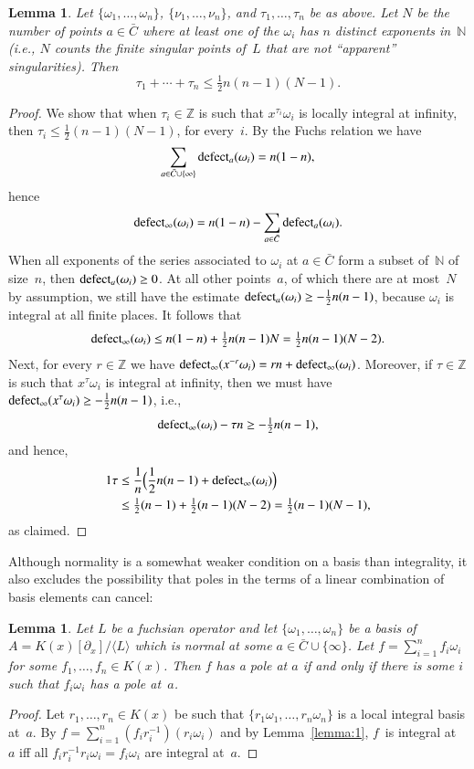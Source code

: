 \documentclass[final,1p,times,authoryear]{elsarticle}
\newtheorem{lemma}[theorem]{Lemma}
\def\<#1>{\langle#1\rangle}
\let\set\mathbb
\begin{document}
\begin{lemma}\label{lemma:bound-exps}
  Let $\{\omega_1,\dots,\omega_n\}$, $\{\nu_1,\dots,\nu_n\}$, and $\tau_1,\dots,\tau_n$ be as above.
  Let $N$ be the number of points $a\in\bar C$ where at least one of the $\omega_i$ has
  $n$ distinct exponents in~$\set N$ (i.e., $N$ counts the
  finite singular points of~$L$ that are not ``apparent'' singularities).
  Then
  \[
    \tau_1+\cdots+\tau_n \leq \tfrac12 n(n-1)(N-1).
  \]
\end{lemma}
\begin{proof}
  We show that when $\tau_i\in\set Z$ is such that $x^{\tau_i}\omega_i$ is locally integral at infinity,
  then $\tau_i\leq \frac12 (n-1)(N-1)$, for every~$i$.
  By the Fuchs relation we have
  \[
    \sum_{a\in\bar C\cup\{\infty\}}\operatorname{defect}_a(\omega_i) = n(1-n),
  \]
  hence
  \[
    \operatorname{defect}_\infty(\omega_i) = n(1-n) - \sum_{a\in\bar C}\operatorname{defect}_a(\omega_i).
  \]
  When all exponents of the series associated to $\omega_i$ at $a\in\bar C$ form a subset of~$\set N$ of size~$n$, then
  $\operatorname{defect}_a(\omega_i)\geq0$. At all other points~$a$, of which there are at most~$N$ by assumption,
  we still have the estimate $\operatorname{defect}_a(\omega_i)\geq-\frac12n(n-1)$, because $\omega_i$ is integral at all finite places.
  It follows that
  \[
    \operatorname{defect}_\infty(\omega_i)\leq n(1-n) + \tfrac12 n(n-1) N = \tfrac12 n(n-1)(N-2).
  \]
  Next, for every $r\in\set Z$ we have $\operatorname{defect}_\infty(x^{-r}\omega_i) = rn+\operatorname{defect}_\infty(\omega_i)$.
  Moreover, if $\tau\in\set Z$ is such that $x^{\tau}\omega_i$ is integral at infinity, then we must have
  $\operatorname{defect}_\infty(x^{\tau}\omega_i)\geq -\frac12n(n-1)$, i.e.,
  \[
    \operatorname{defect}_\infty(\omega_i) - \tau n \geq -\tfrac12n(n-1),
  \]
  and hence,
  \begin{alignat*}1
    \tau &\leq \frac1n\Bigl( \frac12n(n-1) + \defect_\infty(\omega_i) \Bigr) \\
      &\leq \tfrac12 (n-1) + \tfrac12 (n-1)(N-2) = \tfrac12 (n-1)(N-1),
  \end{alignat*}
  as claimed.
\end{proof}

Although normality is a somewhat weaker condition on a basis than integrality,
it also excludes the possibility that poles in the terms of a linear combination
of basis elements can cancel:

\begin{lemma}\label{lemma:3}
  Let $L$ be a fuchsian operator and let $\{\omega_1,\dots,\omega_n\}$ be a basis of $A=K(x)[\partial_x]/\<L>$
  which is normal at some $a\in\bar C\cup\{\infty\}$.
  Let $f=\sum_{i=1}^n f_i\omega_i$ for some $f_1,\dots,f_n\in K(x)$.
  Then $f$ has a pole at $a$ if and only if
  there is some $i$ such that $f_i\omega_i$ has a pole at~$a$.
\end{lemma}
\begin{proof}
  Let $r_1,\dots,r_n\in K(x)$ be such that $\{r_1\omega_1,\dots,r_n\omega_n\}$ is a
  local integral basis at~$a$. By $f=\sum_{i=1}^n
  (f_ir_i^{-1})(r_i\omega_i)$ and by Lemma~\ref{lemma:1}, $f$~is integral at~$a$ iff all
  $f_ir_i^{-1}r_i\omega_i=f_i\omega_i$ are integral at~$a$.
\end{proof}
\end{document}
